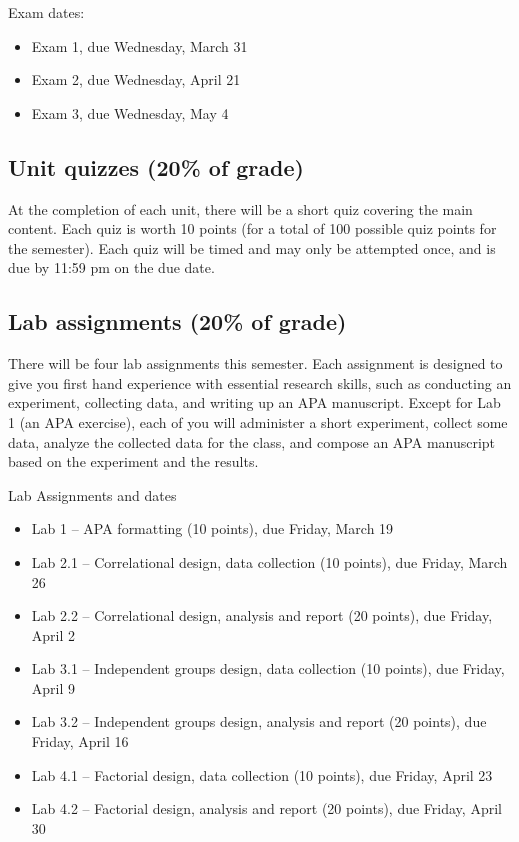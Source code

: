 \documentclass[10pt]{article}
\begin{document}
Exam dates:

\begin{itemize}
\item Exam 1, due Wednesday, March 31
\item Exam 2, due Wednesday, April 21
\item Exam 3, due Wednesday, May 4
\end{itemize}

\subsection*{Unit quizzes (20\% of grade)}
\label{sec:orge4616c8}

At the completion of each unit, there will be a short quiz covering the main content.  Each quiz is worth 10 points (for a total of 100 possible quiz points for the semester).  Each quiz will be timed and may only be attempted once, and is due by 11:59 pm on the due date.

\subsection*{Lab assignments (20\% of grade)}
\label{sec:org53bb645}

There will be four lab assignments this semester.  Each assignment is designed to give you first hand experience with essential research skills, such as conducting an experiment, collecting data, and writing up an APA manuscript.  Except for Lab 1 (an APA exercise), each of you will administer a short experiment, collect some data, analyze the collected data for the class, and compose an APA manuscript based on the experiment and the results. 

Lab Assignments and dates

\begin{itemize}
\item Lab 1 – APA formatting (10 points), due Friday, March 19
\item Lab 2.1 – Correlational design, data collection (10 points), due Friday, March 26
\item Lab 2.2 – Correlational design, analysis and report (20 points), due Friday, April 2
\item Lab 3.1 – Independent groups design, data collection (10 points), due Friday, April 9
\item Lab 3.2 – Independent groups design, analysis and report (20 points), due Friday, April 16
\item Lab 4.1 – Factorial design, data collection (10 points), due Friday, April 23
\item Lab 4.2 – Factorial design, analysis and report (20 points), due Friday, April 30
\end{itemize}
\end{document}
